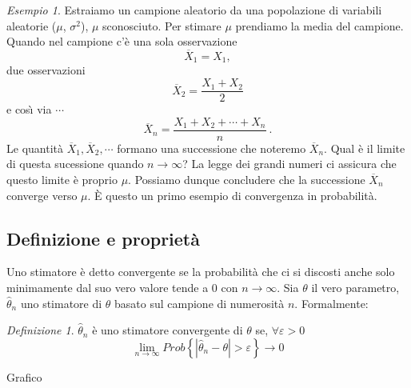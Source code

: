 \documentclass[a4paper]{report}
\newcounter{ese}
\newcounter{def}
\theoremstyle{remark}
\newtheorem{esempio}[ese]{Esempio}
\newtheorem{definizione}[def]{Definizione}
\newcounter{theor}
\begin{document}
\begin{esempio}
\label{esempio media}Estraiamo un campione aleatorio da una popolazione di
variabili aleatorie ($\mu $, $\sigma ^{2}$), $\mu $ sconosciuto. Per stimare 
$\mu $ prendiamo la media del campione. Quando nel campione c'\`{e} una sola
osservazione%
\begin{equation*}
\overline{X}_{1}=X_{1},
\end{equation*}%
due osservazioni 
\begin{equation*}
\overline{X}_{2}=\frac{X_{1}+X_{2}}{2}
\end{equation*}%
e cos\`{\i} via $\cdots $ 
\begin{equation*}
\overline{X}_{n}=\frac{X_{1}+X_{2}+\cdots +X_{n}}{n}\ .
\end{equation*}%
Le quantit\`{a} $\overline{X}_{1},\overline{X}_{2},\cdots $ formano una
successione che noteremo ${\overline{X}_{n}}$. Qual \`{e} il limite di
questa sucessione quando $n\rightarrow \infty $? La legge dei grandi numeri
ci assicura che questo limite \`{e} proprio $\mu $. Possiamo dunque
concludere che la successione ${\overline{X}_{n}}$ converge verso $\mu $. 
\`{E} questo un primo esempio di convergenza in probabilit\`{a}.
\end{esempio}

\subsection{{Definizione e propriet\`{a}}}

Uno stimatore \`{e} detto convergente se la probabilit\`{a} che ci si
discosti anche solo minimamente dal suo vero valore tende a $0$ con $%
n\rightarrow \infty $. Sia $\theta $ il vero parametro, $\hat{\theta}_{n}$
uno stimatore di $\theta $ basato sul campione di numerosit\`{a} $n$.
Formalmente:

\begin{definizione}
$\hat{\theta}_{n}$ \`{e} uno stimatore convergente di $\theta $ se, $\forall
\varepsilon >0$ 
\begin{equation*}
\underset{n\rightarrow \infty }{\lim }Prob\left\{ \left\vert \hat{\theta}%
_{n}-\theta \right\vert >\varepsilon \right\} \rightarrow 0
\end{equation*}
\end{definizione}

\begin{center}
Grafico\vspace{5cm}
\end{center}
\end{document}
